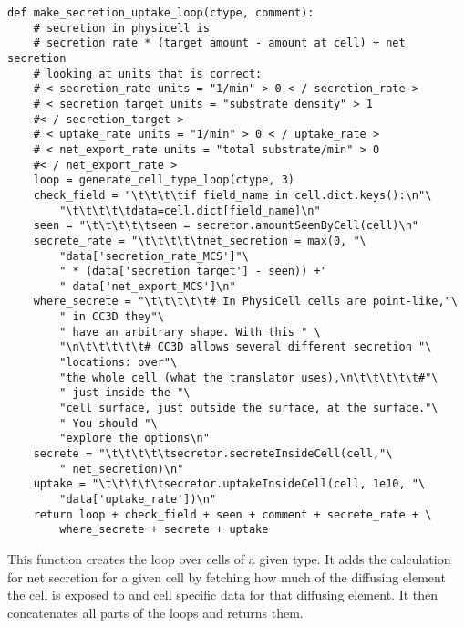\begin{listing}[H]%
\begin{verbatim}
def make_secretion_uptake_loop(ctype, comment):
    # secretion in physicell is
    # secretion rate * (target amount - amount at cell) + net secretion
    # looking at units that is correct:
    # < secretion_rate units = "1/min" > 0 < / secretion_rate >
    # < secretion_target units = "substrate density" > 1 
    #< / secretion_target >
    # < uptake_rate units = "1/min" > 0 < / uptake_rate >
    # < net_export_rate units = "total substrate/min" > 0 
    #< / net_export_rate >
    loop = generate_cell_type_loop(ctype, 3)
    check_field = "\t\t\t\tif field_name in cell.dict.keys():\n"\
        "\t\t\t\t\tdata=cell.dict[field_name]\n"
    seen = "\t\t\t\t\tseen = secretor.amountSeenByCell(cell)\n"
    secrete_rate = "\t\t\t\t\tnet_secretion = max(0, "\
        "data['secretion_rate_MCS']"\
        " * (data['secretion_target'] - seen)) +"
        " data['net_export_MCS']\n"
    where_secrete = "\t\t\t\t\t# In PhysiCell cells are point-like,"\
        " in CC3D they"\
        " have an arbitrary shape. With this " \
        "\n\t\t\t\t\t# CC3D allows several different secretion "\
        "locations: over"\
        "the whole cell (what the translator uses),\n\t\t\t\t\t#"\
        " just inside the "\
        "cell surface, just outside the surface, at the surface."\
        " You should "\
        "explore the options\n"
    secrete = "\t\t\t\t\tsecretor.secreteInsideCell(cell,"\
        " net_secretion)\n"
    uptake = "\t\t\t\t\tsecretor.uptakeInsideCell(cell, 1e10, "\
        "data['uptake_rate'])\n"
    return loop + check_field + seen + comment + secrete_rate + \
        where_secrete + secrete + uptake
\end{verbatim}
\caption{This function creates the loop over cells of a given type. It adds the calculation for net secretion for a given cell by fetching how much of the diffusing element the cell is exposed to and cell specific data for that diffusing element. It then concatenates all parts of the loops and returns them.}\label{code:trans:cc3d:sec-step:gsups:sec-loops:loop}
\end{listing}


